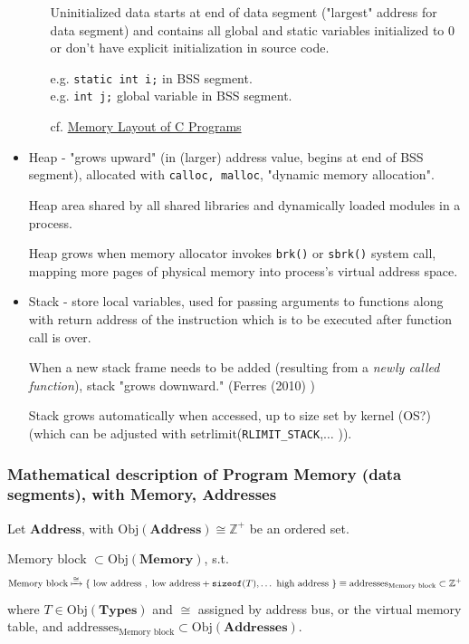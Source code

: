 \documentclass[10pt]{amsart}
\begin{document}
\begin{multicols*}{2}
\begin{itemize}
\begin{itemize}
		Uninitialized data starts at end of data segment ("largest" address for data segment) and contains all global and static variables initialized to 0 or don't have explicit initialization in source code.  
		
		e.g. \verb|static int i;| in BSS segment.  \\
		e.g. \verb|int j;| global variable in BSS segment. 	
		
		  cf. \href{http://www.geeksforgeeks.org/memory-layout-of-c-program/}{Memory Layout of C Programs}  
			
	\end{itemize}
	\item Heap - "grows upward" (in (larger) address value, begins at end of BSS segment), allocated with \verb|calloc, malloc|, "dynamic memory allocation".    
	
	Heap area shared by all shared libraries and dynamically loaded modules in a process.  
	
	Heap grows when memory allocator invokes \verb|brk()| or \verb|sbrk()| system call, mapping more pages of physical memory into process's virtual address space.  
	
	\item Stack - store local variables, used for passing arguments to functions along with return address of the instruction which is to be executed after function call is over.  
	
	When a new stack frame needs to be added (resulting from a \emph{newly called function}), stack "grows downward."  (Ferres (2010) \cite{Ferr2010})  
	
	Stack grows automatically when accessed, up to size set by kernel (OS?) (which can be adjusted with setrlimit(\verb|RLIMIT_STACK|,$\ldots$ )).  \\
	\end{itemize}

\subsubsection{Mathematical description of Program Memory (data segments), with \textbf{Memory}, \textbf{Addresses}}  

Let $\textbf{Address}$, with $\text{Obj}{(\textbf{Address})} \cong \mathbb{Z}^+$ be an ordered set.  

Memory block $\subset \text{Obj}{(\textbf{Memory})}$, s.t. 
\[
\text{Memory block} \xmapsto{ \cong } \lbrace \text{ low address }, \text{ low address} + \texttt{sizeof}(T) , \dots \text{ high address } \rbrace  \equiv \text{addresses}_{\text{Memory block} } \subset \mathbb{Z}^+
\]
where $T \in \text{Obj}{(\textbf{Types})}$ and $\cong$ assigned by address bus, or the virtual memory table, and $\text{addresses}_{\text{Memory block}} \subset \text{Obj}{(\textbf{Addresses})}$.  


\end{multicols*}
\end{document}
